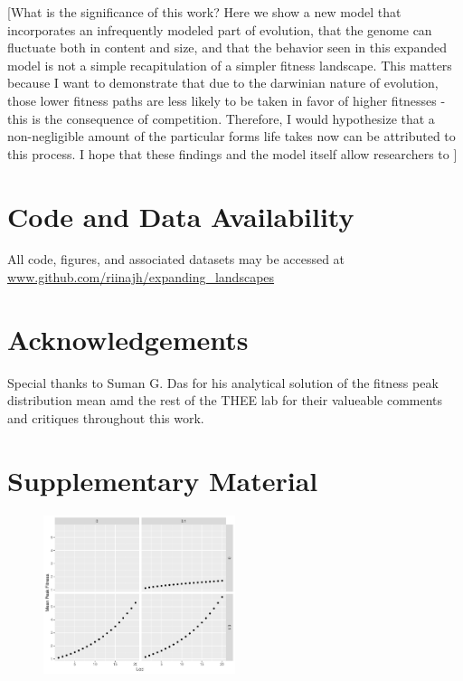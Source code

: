\documentclass[paper=a4, fontsize=11pt,twoside]{scrartcl}       %
\newcommand{\beginsupplement}{
        \setcounter{table}{0}
        \renewcommand{\thetable}{S\arabic{table}}%
        \setcounter{figure}{0}
        \renewcommand{\thefigure}{S\arabic{figure}}%
     }
\begin{document}
[What is the significance of this work? Here we show a new model that incorporates an infrequently modeled part of evolution, that the genome can fluctuate both in content and size, and that the behavior seen in this expanded model is not a simple recapitulation of a simpler fitness landscape. This matters because I want to demonstrate that due to the darwinian nature of evolution, those lower fitness paths are less likely to be taken in favor of higher fitnesses - this is the consequence of competition. Therefore, I would hypothesize that a non-negligible amount of the particular forms life takes now can be attributed to this process. I hope that these findings and the model itself allow researchers to  ]

\section*{Code and Data Availability}

All code, figures, and associated datasets may be accessed at \url{www.github.com/riinajh/expanding_landscapes}

\section*{Acknowledgements}

Special thanks to Suman G. Das for his analytical solution of the fitness peak distribution mean amd the rest of the THEE lab for their valueable comments and critiques throughout this work.

\printbibliography

\section*{Supplementary Material}

\beginsupplement

\begin{figure}[h!]
	\centering
	\includegraphics[width = 0.5\textwidth]{figures/mean_peak_scaling.pdf}
	\caption{}
	\label{supp:peak_scaling}
\end{figure}
\end{document}
